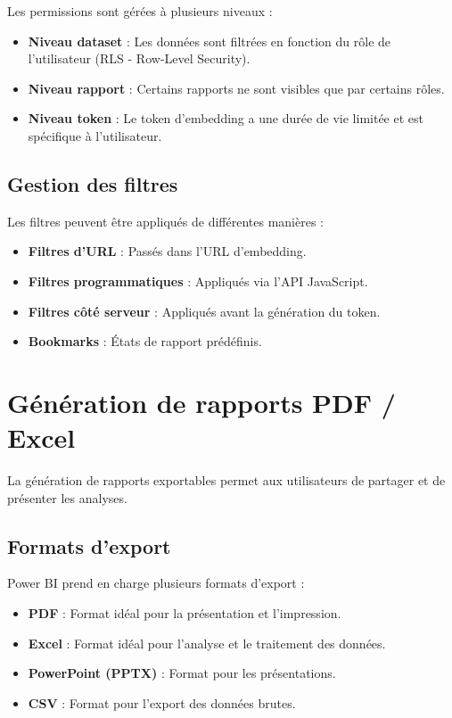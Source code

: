 Les permissions sont gérées à plusieurs niveaux :

\begin{itemize}
    \item \textbf{Niveau dataset} : Les données sont filtrées en fonction du rôle de l'utilisateur (RLS - Row-Level Security).
    \item \textbf{Niveau rapport} : Certains rapports ne sont visibles que par certains rôles.
    \item \textbf{Niveau token} : Le token d'embedding a une durée de vie limitée et est spécifique à l'utilisateur.
\end{itemize}

\subsection{Gestion des filtres}

Les filtres peuvent être appliqués de différentes manières :

\begin{itemize}
    \item \textbf{Filtres d'URL} : Passés dans l'URL d'embedding.
    \item \textbf{Filtres programmatiques} : Appliqués via l'API JavaScript.
    \item \textbf{Filtres côté serveur} : Appliqués avant la génération du token.
    \item \textbf{Bookmarks} : États de rapport prédéfinis.
\end{itemize}

\section{Génération de rapports PDF / Excel}
\label{sec:sprint7-export}

La génération de rapports exportables permet aux utilisateurs de partager et de présenter les analyses.

\subsection{Formats d'export}

Power BI prend en charge plusieurs formats d'export :

\begin{itemize}
    \item \textbf{PDF} : Format idéal pour la présentation et l'impression.
    \item \textbf{Excel} : Format idéal pour l'analyse et le traitement des données.
    \item \textbf{PowerPoint (PPTX)} : Format pour les présentations.
    \item \textbf{CSV} : Format pour l'export des données brutes.
\end{itemize}

